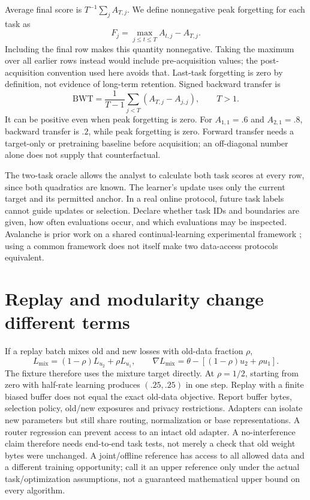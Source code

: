 
Average final score is $T^{-1}\sum_jA_{T,j}$. We define nonnegative peak
forgetting for each task as
\[
F_j=\max_{j\le t\le T}A_{t,j}-A_{T,j}.
\]
Including the final row makes this quantity nonnegative. Taking the maximum over
all earlier rows instead would include pre-acquisition values; the post-acquisition
convention used here avoids that.
Last-task forgetting is zero by definition, not evidence of long-term retention.
Signed backward transfer is
\[
\mathrm{BWT}=\frac1{T-1}\sum_{j<T}(A_{T,j}-A_{j,j}),\qquad T>1.
\]
It can be positive even when peak forgetting is zero. For $A_{1,1}=.6$ and
$A_{2,1}=.8$, backward transfer is $.2$, while peak forgetting is zero.
Forward transfer needs a target-only or pretraining baseline before acquisition;
an off-diagonal number alone does not supply that counterfactual.

The two-task oracle allows the analyst to calculate both task scores at every
row, since both quadratics are known. The learner's update uses only the current
target and its permitted anchor. In a real online protocol, future task labels
cannot guide updates or selection. Declare whether task IDs and boundaries are
given, how often evaluations occur, and which evaluations may be inspected.
Avalanche is prior work on a shared continual-learning experimental framework
\cite{evod50:avalanche}; using a common framework does not itself make two
data-access protocols equivalent.

\section{Replay and modularity change different terms}
If a replay batch mixes old and new losses with old-data fraction $\rho$,
\[
L_{\mathrm{mix}}=(1-\rho)L_{u_2}+\rho L_{u_1},\qquad
\nabla L_{\mathrm{mix}}=\theta-[(1-\rho)u_2+\rho u_1].
\]
The fixture therefore uses the mixture target directly. At $\rho=1/2$,
starting from zero with half-rate learning produces $(.25,.25)$ in one step.
Replay with a finite biased buffer does not equal the exact old-data objective.
Report buffer bytes, selection policy, old/new exposures and privacy restrictions.
Adapters can isolate new parameters but still share routing, normalization or
base representations. A router regression can prevent access to an intact
old adapter. A no-interference claim therefore needs end-to-end task tests,
not merely a check that old weight bytes were unchanged. A joint/offline
reference has access to all allowed data and a different training opportunity;
call it an upper reference only under the actual task/optimization assumptions,
not a guaranteed mathematical upper bound on every algorithm.

